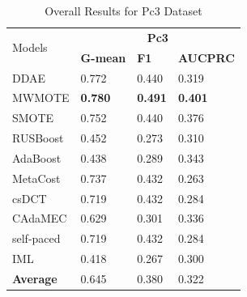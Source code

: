 \begin{table}[H]
    \centering
    \renewcommand\arraystretch{0.85} 
    \begin{tabular}{|p{}<{\centering}|p{}<{\centering}|p{}<{\centering}|p{}<{\centering}|}
    \hline
    \multirow{2}{*}{Models} & \multicolumn{3}{c|}{\textbf{Pc3}}    \\ \cline{2-4} 
                             & \textbf{G-mean} & \textbf{F1} & \textbf{AUCPRC} \\ \hline
    DDAE                     &0.772	&0.440	&0.319            \\ \hline
    MWMOTE                   &\textbf{0.780}&\textbf{0.491}&\textbf{0.401} \\ \hline
    SMOTE                    &0.752	&0.440	&0.376               \\ \hline
    RUSBoost                 &0.452	&0.273	&0.310            \\ \hline
    AdaBoost                 &0.438	&0.289	&0.343            \\ \hline
    MetaCost                 &0.737	&0.432	&0.263            \\ \hline
    csDCT                    &0.719	&0.432	&0.284              \\ \hline
    CAdaMEC                  &0.629	&0.301	&0.336             \\ \hline
    self-paced               &0.719	&0.432	&0.284             \\ \hline
    IML                      &0.418	&0.267	&0.300          \\ \hline\hline
    \textbf{Average}         &0.645	&0.380	&0.322             \\ \hline
    \end{tabular}
    \caption{Overall Results for Pc3 Dataset}
    \label{tab21}
\end{table}

